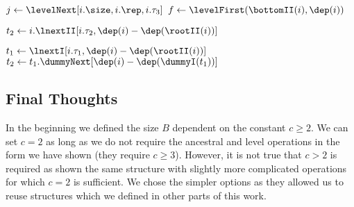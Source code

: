 \begin{algorithm}
\begin{algorithmic}
		\State {}
	\EndIf
	
	\State $j \gets \levelNext[i.\size, i.\rep, i.\tau_3]$ 
		\State $f \gets \levelFirst(\bottomII(i), \dep(i))$  
			\State {}
		\EndIf
		\State {} 
	\EndIf
	
	\State $t_2 \gets i.\lnextII[i.\tau_2, \dep(i) - \dep(\rootII(i))]$ 
		\State {}
		\State {}
	\EndIf
	
	\State $t_1 \gets \lnextI[i.\tau_1, \dep(i) - \dep(\rootII(i))]$ 
		\State $t_2 \gets t_1.\dummyNext[\dep(i) - \dep(\dummyI(t_1))]$
			\State {}
		\Else
			\State {}
		\EndIf
		\State {}
	\Else
		\State {}
	\EndIf
\EndFunction
\end{algorithmic}
\end{algorithm}

\subsection{Final Thoughts}

In the beginning we defined the size $B$ dependent on the constant $c \ge 2$.
We can set $c = 2$ as long as we do not require the ancestral and level operations in the form we have shown (they require $c \ge 3$).
However, it is not true that $c > 2$ is required as \cite{farzan2014uniform} shown the same structure with slightly more complicated operations for which $c = 2$ is sufficient.
We chose the simpler options as they allowed us to reuse structures which we defined in other parts of this work.

